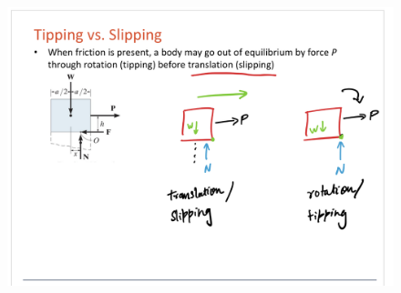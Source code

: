\begin{figure}[!h]
\centering
\includegraphics[angle=0, width=\textwidth]{FrictionFigures/TipSlip.png}
\vspace{-2mm}
\caption{\small {}}
\vspace{-3mm}
\label{Fig:TipSlip}
\end{figure}


